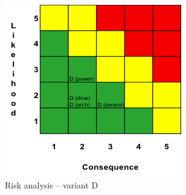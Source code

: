 \documentclass[letterpaper,10pt]{article}
\begin{document}
\begin{figure}[h!tbp]
	\begin{center}
		\includegraphics[scale=1]{images/riskAnalysisD.png}
	\end{center}
	\caption{Risk analysis -- variant D}
	\label{fig:riskAnalysisD}
\end{figure}
\end{document}

